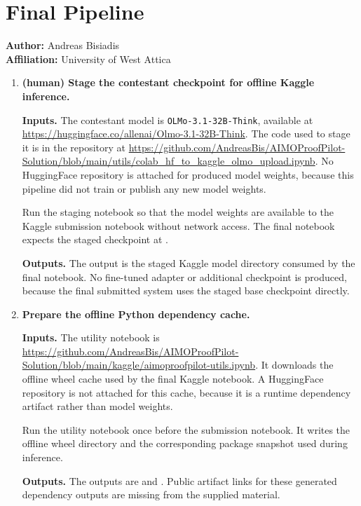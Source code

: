 \section*{Final Pipeline}

\noindent\textbf{Author:} Andreas Bisiadis\\
\textbf{Affiliation:} University of West Attica

\begingroup
\sloppy

\begin{enumerate}
\item \textbf{(human) Stage the contestant checkpoint for offline Kaggle inference.}

\textbf{Inputs.} The contestant model is \texttt{OLMo-3.1-32B-Think}, available at \url{https://huggingface.co/allenai/Olmo-3.1-32B-Think}. The code used to stage it is in the repository at \url{https://github.com/AndreasBis/AIMOProofPilot-Solution/blob/main/utils/colab_hf_to_kaggle_olmo_upload.ipynb}. No HuggingFace repository is attached for produced model weights, because this pipeline did not train or publish any new model weights.

Run the staging notebook so that the model weights are available to the Kaggle submission notebook without network access. The final notebook expects the staged checkpoint at .

\textbf{Outputs.} The output is the staged Kaggle model directory consumed by the final notebook. No fine-tuned adapter or additional checkpoint is produced, because the final submitted system uses the staged base checkpoint directly.

\item \textbf{Prepare the offline Python dependency cache.}

\textbf{Inputs.} The utility notebook is \url{https://github.com/AndreasBis/AIMOProofPilot-Solution/blob/main/kaggle/aimoproofpilot-utils.ipynb}. It downloads the offline wheel cache used by the final Kaggle notebook. A HuggingFace repository is not attached for this cache, because it is a runtime dependency artifact rather than model weights.

Run the utility notebook once before the submission notebook. It writes the offline wheel directory and the corresponding package snapshot used during inference.

\textbf{Outputs.} The outputs are  and . Public artifact links for these generated dependency outputs are missing from the supplied material.


\end{enumerate}
